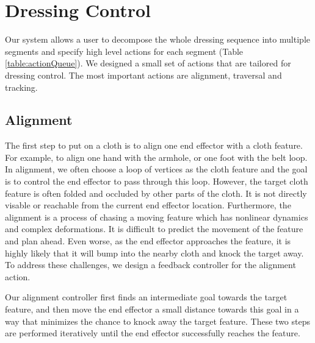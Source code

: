 \section{Dressing Control}

Our system allows a user to decompose the whole dressing sequence into multiple segments and specify high level actions for each segment (Table \ref{table:actionQueue}). We designed a small set of actions that are tailored for dressing control. The most important actions are alignment, traversal and tracking. 

\subsection{Alignment}
The first step to put on a cloth is to align one end effector with a cloth feature. For example, to align one hand with the armhole, or one foot with the belt loop. In alignment, we often choose a loop of vertices as the cloth feature and the goal is to control the end effector to pass through this loop. However, the target cloth feature is often folded and occluded by other parts of the cloth. It is not directly visable or reachable from the current end effector location. Furthermore, the alignment is a process of chasing a moving feature which has nonlinear dynamics and complex deformations. It is difficult to predict the movement of the feature and plan ahead. Even worse, as the end effector approaches the feature, it is highly likely that it will bump into the nearby cloth and knock the target away.  To address these challenges, we design a feedback controller for the alignment action.

Our alignment controller first finds an intermediate goal towards the target feature, and then move the end effector a small distance towards this goal in a way that minimizes the chance to knock away the target feature. These two steps are performed iteratively until the end effector successfully reaches the feature.

